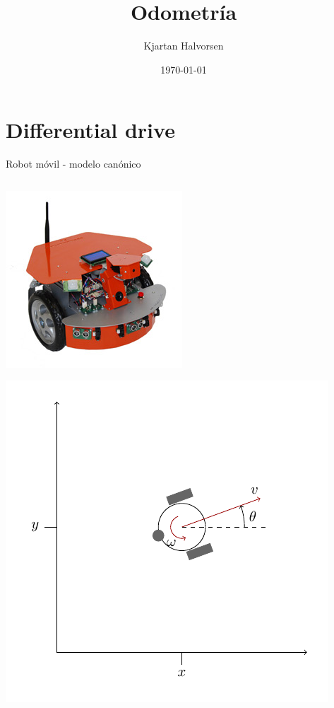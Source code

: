 \documentclass[presentation,aspectratio=169]{beamer}
\author{Kjartan Halvorsen}
\date{\today}
\title{Odometría}
\begin{document}
\maketitle

\section{Differential drive}
\label{sec:org011ce50}

\begin{frame}[label={sec:org9031737}]{Robot móvil - modelo canónico}
\begin{columns}
\begin{column}{0.4\columnwidth}
\begin{center}
 \includegraphics[width=.3\linewidth]{../figures/X80Pro.jpg}
\end{center}
\begin{center}
 \includegraphics[width=1.0\linewidth]{../figures/unicycle-model}
\end{center}
\end{column}


\end{columns}
\end{frame}
\end{document}
